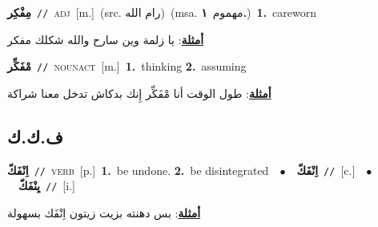 \documentclass[10pt,a4paper,twoside]{article} %
\begin{document}
\begin{multicols}{2}
{\setlength\topsep{0pt}\textbf{\foreignlanguage{arabic}{مِفْكِر}}\ {\color{gray}\texttt{//}\color{black}}\ \textsc{adj}\ [m.]\ (src. \color{gray}\foreignlanguage{arabic}{رام الله}\color{black})\ \color{gray}(msa. \foreignlanguage{arabic}{مهموم}~\foreignlanguage{arabic}{\textbf{١.}})\color{black}\ \textbf{1.}~careworn\  \begin{flushright}\color{gray}\foreignlanguage{arabic}{\textbf{\underline{\foreignlanguage{arabic}{أمثلة}}}: يا زلمة وين سارح والله شكلك مفكر}\end{flushright}\color{black}} \vspace{2mm}

{\setlength\topsep{0pt}\textbf{\foreignlanguage{arabic}{مْفَكِّر}}\ {\color{gray}\texttt{//}\color{black}}\ \textsc{noun\textunderscore act}\ [m.]\ \textbf{1.}~thinking  \textbf{2.}~assuming\  \begin{flushright}\color{gray}\foreignlanguage{arabic}{\textbf{\underline{\foreignlanguage{arabic}{أمثلة}}}: طول الوقت أنا مْفَكِّر إِنك بدكاش تدخل معنا شراكة}\end{flushright}\color{black}} \vspace{2mm}

\vspace{-3mm}
\subsection*{\color{blue}\foreignlanguage{arabic}{ف.ك.ك}\color{blue}{}} 

{\setlength\topsep{0pt}\textbf{\foreignlanguage{arabic}{اِنْفَكّ}}\ {\color{gray}\texttt{//}\color{black}}\ \textsc{verb}\ [p.]\ \textbf{1.}~be undone.  \textbf{2.}~be disintegrated\ \ $\bullet$\ \ \setlength\topsep{0pt}\textbf{\foreignlanguage{arabic}{اِنْفَكّ}}\ {\color{gray}\texttt{//}\color{black}}\ [c.]\ \ $\bullet$\ \ \setlength\topsep{0pt}\textbf{\foreignlanguage{arabic}{يِنْفَكّ}}\ {\color{gray}\texttt{//}\color{black}}\ [i.]\  \begin{flushright}\color{gray}\foreignlanguage{arabic}{\textbf{\underline{\foreignlanguage{arabic}{أمثلة}}}: بس دهنته بزيت زيتون اِنْفَك بسهولة}\end{flushright}\color{black}} \vspace{2mm}


\end{multicols}
\end{document}
